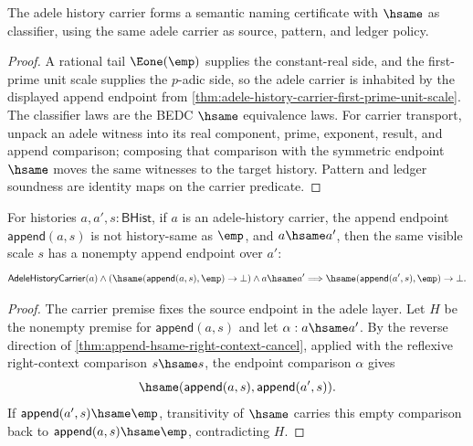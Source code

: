 \begin{theorem}
\label{thm:adele-history-carrier-semantic-namecert}
The adele history carrier forms a semantic naming certificate with $\hsame$ as
classifier, using the same adele carrier as source, pattern, and ledger policy.
\end{theorem}
\begin{proof}
A rational tail $\Eone(\emp)$ supplies the constant-real side, and the
first-prime unit scale supplies the $p$-adic side, so the adele carrier is
inhabited by the displayed append endpoint from
\autoref{thm:adele-history-carrier-first-prime-unit-scale}. The classifier
laws are the BEDC $\hsame$ equivalence laws. For carrier transport, unpack an
adele witness into its real component, prime, exponent, result, and append
comparison; composing that comparison with the symmetric endpoint $\hsame$
moves the same witnesses to the target history. Pattern and ledger soundness
are identity maps on the carrier predicate.
\end{proof}

\begin{theorem}
\label{thm:adele-history-carrier-visible-scale-append-result-hsame-transport}
For histories $a,a',s:\mathsf{BHist}$, if $a$ is an adele-history carrier,
the append endpoint $\mathsf{append}(a,s)$ is not history-same as $\emp$, and
$a\hsame a'$, then the same visible scale $s$ has a nonempty append endpoint
over $a'$:
$$
\mathsf{AdeleHistoryCarrier}(a)\land
(\hsame(\mathsf{append}(a,s),\emp)\to\bot)\land
 a\hsame a'
\Longrightarrow
\hsame(\mathsf{append}(a',s),\emp)\to\bot.
$$
\end{theorem}
\begin{proof}
The carrier premise fixes the source endpoint in the adele layer. Let
$H$ be the nonempty premise for $\mathsf{append}(a,s)$ and let
$\alpha:a\hsame a'$. By the reverse direction of
\autoref{thm:append-hsame-right-context-cancel}, applied with the reflexive
right-context comparison $s\hsame s$, the endpoint comparison $\alpha$ gives
$$
\hsame(\mathsf{append}(a,s),\mathsf{append}(a',s)).
$$
If $\mathsf{append}(a',s)\hsame\emp$, transitivity of $\hsame$ carries this
empty comparison back to $\mathsf{append}(a,s)\hsame\emp$, contradicting $H$.
\end{proof}

